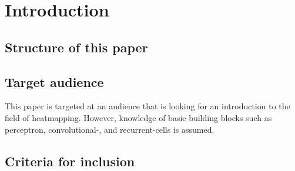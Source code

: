 \section{Introduction}
\blindtext[3]

\subsection{Structure of this paper}
\blindtext[3]

\subsection{Target audience}
This paper is targeted at an audience that is looking for an introduction to 
the field of heatmapping. However, knowledge of basic building blocks such as 
perceptron, convolutional-, and recurrent-cells is assumed.

\subsection{Criteria for inclusion}
\blindtext[3]